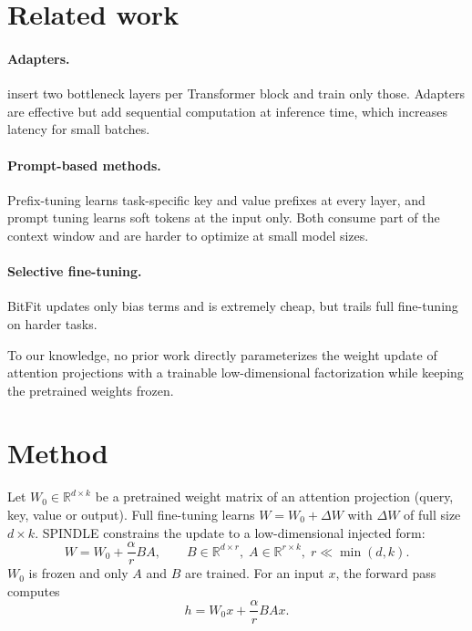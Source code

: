 \documentclass[10pt]{article}
\begin{document}
\section{Related work}
\paragraph{Adapters.} \citet{houlsby} insert two bottleneck layers per Transformer block and train only those. Adapters are effective but add sequential computation at inference time, which increases latency for small batches.

\paragraph{Prompt-based methods.} Prefix-tuning \citep{prefix} learns task-specific key and value prefixes at every layer, and prompt tuning \citep{prompttuning} learns soft tokens at the input only. Both consume part of the context window and are harder to optimize at small model sizes.

\paragraph{Selective fine-tuning.} BitFit \citep{bitfit} updates only bias terms and is extremely cheap, but trails full fine-tuning on harder tasks.

To our knowledge, no prior work directly parameterizes the weight update of attention projections with a trainable low-dimensional factorization while keeping the pretrained weights frozen.

\section{Method}
\label{sec:method}
Let $W_0 \in \mathbb{R}^{d \times k}$ be a pretrained weight matrix of an attention projection (query, key, value or output). Full fine-tuning learns $W = W_0 + \Delta W$ with $\Delta W$ of full size $d \times k$. SPINDLE constrains the update to a low-dimensional injected form:
\begin{equation}
W = W_0 + \frac{\alpha}{r} B A, \qquad B \in \mathbb{R}^{d \times r},\; A \in \mathbb{R}^{r \times k},\; r \ll \min(d, k).
\end{equation}
$W_0$ is frozen and only $A$ and $B$ are trained. For an input $x$, the forward pass computes
\begin{equation}
h = W_0 x + \frac{\alpha}{r} B A x .
\end{equation}
\end{document}
